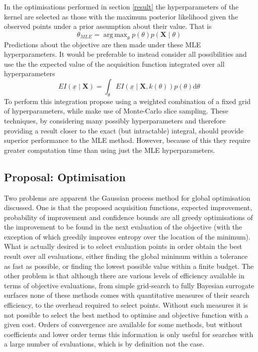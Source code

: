 \documentclass[a4paper, 10 pt, conference]{ieeeconf}  %
\DeclareMathOperator*{\argmax}{arg\,max}
\begin{document}
In the optimisations performed in section \ref{result} the hyperparameters of the kernel are selected as those with the maximum posterior likelihood given the observed points under a prior assumption about their value. That is
\begin{equation}
\theta_{MLE} = \argmax_{\theta} p(\theta)p( \mathbf{X} \mid \theta)
\end{equation}
Predictions about the objective are then made under these MLE hyperparameters. It would be preferable to instead consider all possibilities and use the the expected value of the acquisition function integrated over all hyperparameters
\begin{equation}
EI(\underline{x} \mid \mathbf{X})  = \int_\theta EI(\underline{x} \mid \mathbf{X}, k(\theta)) p(\theta) \mathrm{d}\theta
\end{equation}
To perform this integration \cite{garnettgaussian} propose using a weighted combination of a fixed grid of hyperparameters, while \cite{murray2010slice} make use of Monte-Carlo slice sampling. These techniques, by considering many possibly hyperparameters and therefore providing a result closer to the exact (but intractable) integral, should provide superior performance to the MLE method. However, because of this they require greater computation time than using just the MLE hyperparameters.

\subsection{Proposal: Optimisation}
Two problems are apparent the Gaussian process method for global optimisation discussed. One is that the proposed acquisition functions, expected improvement, probability of improvement and confidence bounds are all greedy optimisations of the improvement to be found in the next evaluation of the objective (with the exception of \cite{hennig2012entropy} which greedily improves entropy over the location of the minimum). What is actually desired is to select evaluation points in order obtain the best result over all evaluations, either finding the global minimum within a tolerance as fast as possible, or finding the lowest possible value within a finite budget. The other problem is that although there are various levels of efficiency available in terms of objective evaluations, from simple grid-search to fully Bayesian surrogate surfaces none of these methods comes with quantitative measures of their search efficiency, to the overhead required to select points. Without such measures it is not possible to select the best method to optimise and objective function with a given cost. Orders of convergence are available for some methods, but without coefficients and lower order terms this information is only useful for searches with a large number of evaluations, which is by definition not the case.
\end{document}
